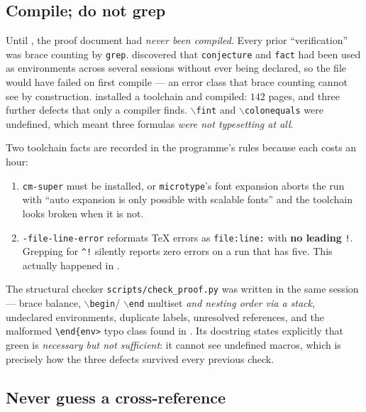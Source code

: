 \subsection{Compile; do not grep}

Until , the proof document had \emph{never been compiled}. Every prior
``verification'' was brace counting by \texttt{grep}.  discovered that
\texttt{conjecture} and \texttt{fact} had been used as environments across
several sessions without ever being declared, so the file would have failed on
first compile --- an error class that brace counting cannot see by
construction.  installed a toolchain and compiled: \(142\) pages, and
three further defects that only a compiler finds. \(\backslash\)\texttt{fint}
and \(\backslash\)\texttt{colonequals} were undefined, which meant three
formulas \emph{were not typesetting at all}.

Two toolchain facts are recorded in the programme's rules because each costs
an hour:

\begin{enumerate}[leftmargin=2em]
\item \texttt{cm-super} must be installed, or \texttt{microtype}'s font
  expansion aborts the run with ``auto expansion is only possible with
  scalable fonts'' and the toolchain looks broken when it is not.
\item \texttt{-file-line-error} reformats \TeX{} errors as
  \texttt{file:line:} with \textbf{no leading} \texttt{!}. Grepping for
  \verb|^!| silently reports zero errors on a run that has five. This actually
  happened in .
\end{enumerate}

The structural checker \texttt{scripts/check\_proof.py} was written in the
same session --- brace balance, \(\backslash\)\texttt{begin}/%
\(\backslash\)\texttt{end} multiset \emph{and nesting order via a stack},
undeclared environments, duplicate labels, unresolved references, and the
malformed \verb|\end{env>| typo class found in . Its docstring states
explicitly that green is \emph{necessary but not sufficient}: it cannot see
undefined macros, which is precisely how the three  defects survived
every previous check.

\subsection{Never guess a cross-reference}

